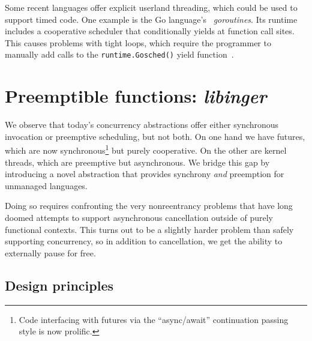 \begin{swallowsections}
\begin{swallowfigures}

\end{swallowfigures}
\end{swallowsections}




Some recent languages offer explicit userland threading, which could be used to
support timed
code.  One example is the Go language's~\cite{www-golang} \textit{goroutines}.
Its runtime includes a cooperative scheduler that conditionally yields
at function call sites.  This causes problems with tight loops, which require the
programmer to manually add calls to the \texttt{runtime.Gosched()}
yield function~\cite{www-golang-tightloop}.




\section{Preemptible functions: \textit{libinger}}

We observe that today's concurrency abstractions offer either synchronous invocation
or preemptive scheduling, but not both.  On one hand we have futures, which are now
synchronous\footnote{Code interfacing with futures via the ``async/await''
continuation passing style is now prolific.} but purely cooperative.  On the other
are kernel threads, which are preemptive but asynchronous.  We bridge this gap by
introducing a novel abstraction that provides synchrony \textit{and} preemption for
unmanaged languages.

Doing so requires confronting the very nonreentrancy problems that have long doomed
attempts to support asynchronous cancellation outside of purely functional contexts.
This turns out to be a slightly harder problem than safely supporting concurrency, so
in addition to cancellation, we get the ability to externally pause for free.

\begin{swallowsections}

\end{swallowsections}


\subsection{Design principles}

